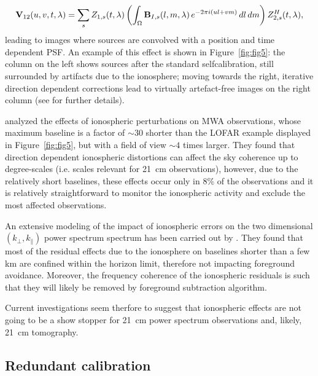 \begin{itemize}
\begin{equation}
{\bf V}_{12} (u,v,t,\lambda) = \sum_s Z_{1,s} (t, \lambda) \left ( \int_\Omega {\bf B}_{I,s} (l, m, \lambda) \, e^{-2 \pi i (ul + vm)} \,  dl \, dm \right ) Z_{2,s}^H (t, \lambda),
\label{eq:sec:12}
\end{equation}
leading to images where sources are convolved with a position and time dependent PSF. An example of this effect is shown in Figure~\ref{fig:fig5}: the column on the left shows sources after the standard selfcalibration, still surrounded by artifacts due to the ionosphere; moving towards the right,  iterative direction dependent corrections lead to virtually artefact-free images on the right column (see \cite{vanweeren16} for further details). 

\cite{trott17b} analyzed the effects of ionospheric perturbations on MWA observations, whose maximum baseline is a factor of $\sim 30$ shorter than the LOFAR example displayed in Figure~\ref{fig:fig5}, but with a field of view $\sim 4$ times larger. They found that direction dependent ionospheric distortions can affect the sky coherence up to degree-scales (i.e. scales relevant for 21~cm observations), however, due to the relatively short baselines, these effects occur only in 8\% of the observations and it is relatively straightforward to monitor the ionospheric activity and exclude the most affected observations.

An extensive modeling of the impact of ionospheric errors on the two dimensional $(k_\perp,k_\parallel)$ power spectrum spectrum has been carried out by \cite{vedantham16}. They found that most of the residual effects due to the ionosphere on baselines shorter than a few km are confined within the horizon limit, therefore not impacting foreground avoidance. Moreover, the frequency coherence of the ionospheric residuals is such that they will likely be removed by foreground subtraction algorithm.

Current investigations seem therfore to suggest that ionospheric effects are not going to be a show stopper for 21~cm power spectrum observations and, likely, 21~cm tomography. 
\end{itemize}





\subsection{Redundant calibration}

